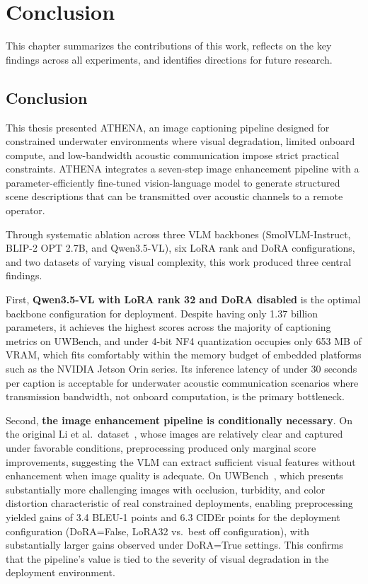 \chapter{Conclusion} \label{sec:conclusion}
This chapter summarizes the contributions of this work, reflects on the key findings across all experiments, and identifies directions for future research.

\section{Conclusion}

This thesis presented ATHENA, an image captioning pipeline designed for constrained underwater environments where visual degradation, limited onboard compute, and low-bandwidth acoustic communication impose strict practical constraints. ATHENA integrates a seven-step image enhancement pipeline with a parameter-efficiently fine-tuned vision-language model to generate structured scene descriptions that can be transmitted over acoustic channels to a remote operator.

Through systematic ablation across three VLM backbones (SmolVLM-Instruct, BLIP-2 OPT 2.7B, and Qwen3.5-VL), six LoRA rank and DoRA configurations, and two datasets of varying visual complexity, this work produced three central findings.

First, \textbf{Qwen3.5-VL with LoRA rank 32 and DoRA disabled} is the optimal backbone configuration for deployment. Despite having only 1.37 billion parameters, it achieves the highest scores across the majority of captioning metrics on UWBench, and under 4-bit NF4 quantization occupies only 653 MB of VRAM, which fits comfortably within the memory budget of embedded platforms such as the NVIDIA Jetson Orin series. Its inference latency of under 30 seconds per caption is acceptable for underwater acoustic communication scenarios where transmission bandwidth, not onboard computation, is the primary bottleneck.

Second, \textbf{the image enhancement pipeline is conditionally necessary}. On the original Li et al.\ dataset~\cite{mainref}, whose images are relatively clear and captured under favorable conditions, preprocessing produced only marginal score improvements, suggesting the VLM can extract sufficient visual features without enhancement when image quality is adequate. On UWBench~\cite{uwbench}, which presents substantially more challenging images with occlusion, turbidity, and color distortion characteristic of real constrained deployments, enabling preprocessing yielded gains of 3.4 BLEU-1 points and 6.3 CIDEr points for the deployment configuration (DoRA=False, LoRA32 vs.\ best off configuration), with substantially larger gains observed under DoRA=True settings. This confirms that the pipeline's value is tied to the severity of visual degradation in the deployment environment.

